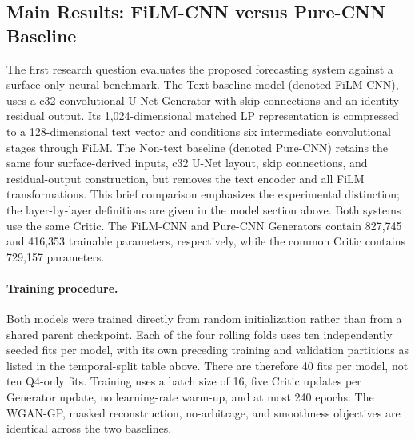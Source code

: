 

\subsection*{Main Results: FiLM-CNN versus Pure-CNN Baseline}
\label{subsec:ch3:film_pure_cnn_baseline}

The first research question evaluates the proposed forecasting system against
a surface-only neural benchmark. The Text baseline model (denoted FiLM-CNN), uses a
c32 convolutional U-Net Generator with skip connections and an identity
residual output. Its 1,024-dimensional matched LP representation is compressed
to a 128-dimensional text vector and conditions six intermediate convolutional
stages through FiLM. The Non-text baseline (denoted Pure-CNN) retains the same four
surface-derived inputs, c32 U-Net layout, skip connections, and residual-output
construction, but removes the text encoder and all FiLM transformations.  This
brief comparison emphasizes the experimental distinction; the layer-by-layer
definitions are given in the model section above. Both systems use the same
Critic. The FiLM-CNN and Pure-CNN Generators contain 827,745 and 416,353 trainable parameters,
respectively, while the common Critic contains 729,157 parameters.


\paragraph*{Training procedure.}
Both models were trained directly from random initialization rather than
from a shared parent checkpoint. Each of the four rolling folds uses ten
independently seeded fits per model, with its own preceding training and
validation partitions as listed in the temporal-split table above. There are
therefore 40 fits per model, not ten Q4-only fits. Training uses a batch size of 16, five Critic updates per Generator update, no learning-rate warm-up, and at most 240 epochs.  The
WGAN-GP, masked reconstruction, no-arbitrage, and smoothness objectives are
identical across the two baselines.


